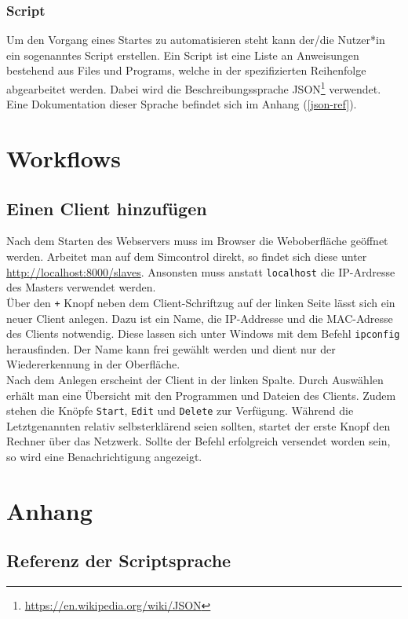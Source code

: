 \documentclass[accentcolor=tud1c, paper=a4, colorback]{tudreport}
\newcommand{\ind}[1]{#1\index{#1}}
\begin{document}
	\subsection{\ind{Script}}
	Um den Vorgang eines Startes zu automatisieren steht kann der/die Nutzer*in ein sogenanntes Script erstellen.
	Ein Script ist eine Liste an Anweisungen bestehend aus Files und Programs, welche in der spezifizierten
	Reihenfolge abgearbeitet werden. Dabei wird die Beschreibungssprache 
	\ind{JSON}\footnote{\url{https://en.wikipedia.org/wiki/JSON}} verwendet. Eine Dokumentation dieser Sprache
	befindet sich im Anhang (\autoref{json-ref}).

	\chapter{Workflows}
	\section{Einen Client hinzufügen}
	Nach dem Starten des Webservers muss im Browser die Weboberfläche geöffnet werden.
	Arbeitet man auf dem \ind{Simcontrol} direkt, so findet sich diese unter
	\url{http://localhost:8000/slaves}. Ansonsten muss anstatt \texttt{localhost}
	die \ind{IP-Ardresse} des Masters verwendet werden.
	\\
	Über den \texttt{+} Knopf neben dem Client-Schriftzug auf der linken Seite
	lässt sich ein neuer Client anlegen. Dazu ist ein Name, die IP-Addresse und
	die MAC-Adresse des Clients notwendig. Diese lassen sich unter Windows
	mit dem Befehl \texttt{ipconfig} herausfinden. Der Name kann frei gewählt
	werden und dient nur der Wiedererkennung in der Oberfläche.
	\\
	Nach dem Anlegen erscheint der Client in der linken Spalte. Durch Auswählen erhält
	man eine Übersicht mit den Programmen und Dateien des Clients. Zudem stehen die
	Knöpfe \texttt{Start}, \texttt{Edit} und \texttt{Delete} zur Verfügung.
	Während die Letztgenannten relativ selbsterklärend seien sollten, startet der
	erste Knopf den Rechner über das Netzwerk. Sollte der Befehl erfolgreich
	versendet worden sein, so wird eine Benachrichtigung angezeigt.
	\chapter{Anhang}
	\section{Referenz der Scriptsprache}
	\label{json-ref}

	\clearpage
	\printindex
\end{document}
